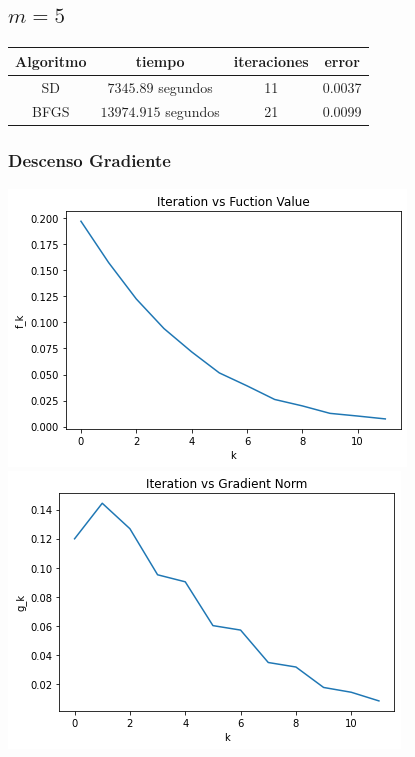 \documentclass[11pt,letterpaper]{article}
\theoremstyle{definition}
\theoremstyle{definition}
\theoremstyle{definition}
\begin{document}
\subsection{$ m = 5 $}
\begin{center}
	\begin{tabular}{cccc}
		\hline
		Algoritmo & tiempo & iteraciones  & error \\
		\hline
		SD   & $ 7345.89 $ segundos & 11 & 0.0037  \\
		BFGS & $ 13974.915 $ segundos  & 21 &0.0099 \\
		\hline
	\end{tabular}
\end{center}
\subsubsection{Descenso Gradiente}
\begin{center}
	\includegraphics[width=0.7\linewidth]{graficas/sd_f_5}
	\includegraphics[width=0.7\linewidth]{graficas/sd_g_5}
\end{center}
\end{document}
